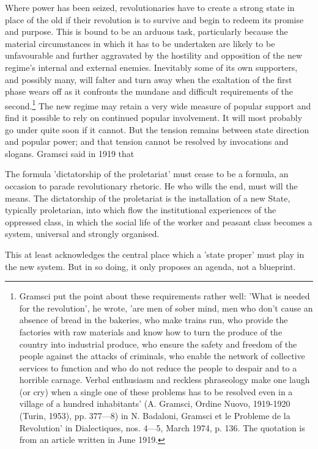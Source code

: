 Where power has been seized, revolutionaries have to create a strong state in place of the old if their revolution is to survive and begin to redeem its promise and purpose. This is bound to be an arduous task, particularly because the material circumstances in which it has to be undertaken are likely to be unfavourable and further aggravated by the hostility and opposition of the new regime's internal and external enemies. Inevitably some of its own supporters, and possibly many, will falter and turn away when the exaltation of the first phase wears off as it confronts the mundane and difficult requirements of the second.\footnote{Gramsci put the point about these requirements rather well: 'What is needed for the revolution', he wrote, 'are men of sober mind, men who don't cause an absence of bread in the bakeries, who make trains run, who provide the factories with raw materials and know how to turn the produce of the country into industrial produce, who ensure the safety and freedom of the people against the attacks of criminals, who enable the network of collective services to function and who do not reduce the people to despair and to a horrible carnage. Verbal enthusiasm and reckless phraseology make one laugh (or cry) when a single one of these problems has to be resolved even in a village of a hundred inhabitants' (A. Gramsci, Ordine Nuovo, 1919-1920 (Turin, 1953), pp. 377—8) in N. Badaloni, Gramsci et le Probleme de la Revolution' in Dialectiques, nos. 4—5, March 1974, p. 136. The quotation is from an article written in June 1919.} The new regime may retain a very wide measure of popular support and find it possible to rely on continued popular involvement. It will most probably go under quite soon if it cannot. But the tension remains between state direction and popular power; and that tension cannot be resolved by invocations and slogans. Gramsci said in 1919 that
\begin{displayquote}
    The formula 'dictatorship of the proletariat' must cease to be a formula, an occasion to parade revolutionary rhetoric. He who wills the end, must will the means. The dictatorship of the proletariat is the installation of a new State, typically proletarian, into which flow the institutional experiences of the oppressed class, in which the social life of the worker and peasant class becomes a system, universal and strongly organised.
\end{displayquote}

This at least acknowledges the central place which a 'state proper' must play in the new system. But in so doing, it only proposes an agenda, not a blueprint.

